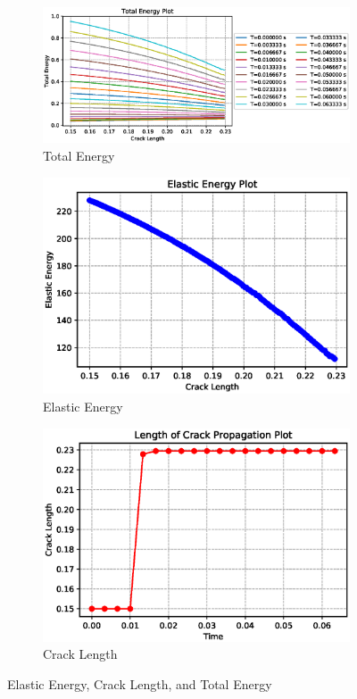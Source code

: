 \documentclass[a4paper,11pt]{article}
\begin{document}
\begin{figure}[h!]
	\begin{subfigure}[b]{\linewidth}
		\centering
		\includegraphics[width=\linewidth]{picture/conference/totalenergycase}
		\caption{Total Energy}
		\label{fig:totalenergycase}
	\end{subfigure}
	\quad
	\begin{subfigure}[b]{0.49\linewidth}
		\centering
		\includegraphics[width=\linewidth]{picture/conference/elasticcase}
		\caption{Elastic Energy}
		\label{fig:elasticcase}
	\end{subfigure}
	\quad
	\begin{subfigure}[b]{0.49\linewidth}
		\centering
		\includegraphics[width=\linewidth]{picture/conference/cracklengthcase}
		\caption{Crack Length}
		\label{fig:cracklengthcase}
	\end{subfigure}
	\caption{Elastic Energy, Crack Length, and Total Energy}
	\label{fig:crackcase}
\end{figure}
\end{document}
